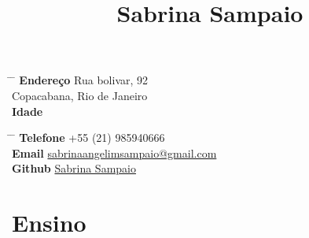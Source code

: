 \documentclass[10pt]{article} %
\begin{document}


\title{Sabrina Sampaio} %


\parbox{0.5\textwidth}{ %
\begin{tabbing} %
\hspace{3cm} \= \hspace{4cm} \= \kill %
{\bf Endereço} \> Rua bolivar, 92\\ %
\> Copacabana, Rio de Janeiro \\ %
{\bf Idade}  \\ %
\end{tabbing}}
\hfill %
\parbox{0.5\textwidth}{ %
\begin{tabbing} %
\hspace{3cm} \= \hspace{4cm} \= \kill %
{\bf Telefone} \> +55 (21) 985940666 \\ %
{\bf Email} \> \href{mailto:sabrinaangelimsampaio@gmail.com}{sabrinaangelimsampaio@gmail.com} \\ %
{\bf Github} \> \href{https://www.github.com/SabraAS}{Sabrina Sampaio} \\ %
\end{tabbing}}


\section{Ensino}


\end{document}
